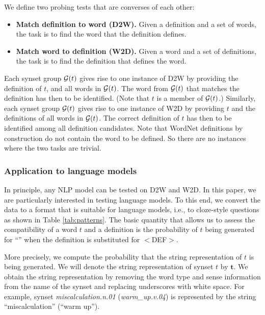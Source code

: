 \documentclass[11pt,a4paper]{article}
\begin{document}
We define two probing tests that are converses of each other:
\begin{itemize}
  \item \textbf{Match definition to word (D2W).} Given a
    definition and a set of words, the task is to find the
    word that the definition defines.
  \item \textbf{Match word to definition (W2D).} Given a
    word and a set of definitions, the task is to find the
    definition that defines the word.
    \end{itemize}
Each synset group ${\cal G}(t)$ gives rise to one instance
of D2W by providing the definition of $t$, and all words in
${\cal G}(t)$. The word from ${\cal G}(t)$ that matches the
definition has then to be identified. (Note that $t$ is a
member of ${\cal G}(t)$.)
Similarly, each synset group ${\cal G}(t)$ gives rise to one instance
of W2D by providing $t$ and the definitions of all words in
${\cal G}(t)$. The
correct definition  of $t$ has then to be identified among
all definition  candidates. Note that WordNet definitions by
construction do not contain the word to be defined. So there
are no instances where the two tasks are trivial.

\subsubsection{Application to language models}
In principle, any NLP model can be tested on D2W and W2D.
In this paper, we are particularly
interested in testing language models. To this end, we 
convert the data to a format that is suitable for language
models, i.e., to cloze-style questions as
shown in Table
\ref{tab:patterns}. The basic quantity that allows us to
assess the compatibility of a word $t$ and a definition is the
probability of
$t$ being generated for 
``\underline{\hspace{3mm}}'' when the definition is substituted for $<$DEF$>$.

More precisely, we compute the probability that the string
representation of $t$ is being generated.
We will denote the string representation of synset $t$ by
$\bm{t}$. 
We obtain the string representation by removing
the word type and sense information from the name of the
synset and replacing underscores with white space. For
example, synset \emph{miscalculation.n.01}
(\emph{warm\_up.v.04})
is represented by
the string ``miscalculation'' (``warm
up'').
\end{document}
